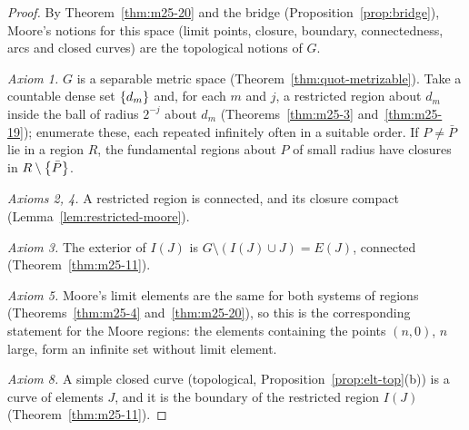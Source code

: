 \begin{proof}
By Theorem~\ref{thm:m25-20} and the bridge (Proposition~\ref{prop:bridge}), Moore's notions for this space (limit
points, closure, boundary, connectedness, arcs and closed curves) are the topological notions of $G$.

\emph{Axiom 1.} $G$ is a separable metric space (Theorem~\ref{thm:quot-metrizable}). Take a countable dense set
$\left\{ d_m \right\}$ and, for each $m$ and $j$, a restricted region about $d_m$ inside the ball of radius $2^{-j}$ about
$d_m$ (Theorems~\ref{thm:m25-3} and~\ref{thm:m25-19}); enumerate these, each repeated infinitely often in a
suitable order. If $P\ne\bar P$ lie in a region $R$, the fundamental regions about $P$ of small radius have closures
in $R\setminus\left\{ \bar P \right\}$.

\emph{Axioms 2, 4.} A restricted region is connected, and its closure compact (Lemma~\ref{lem:restricted-moore}).

\emph{Axiom 3.} The exterior of $I(J)$ is $G\setminus(I(J)\cup J)=E(J)$, connected (Theorem~\ref{thm:m25-11}).

\emph{Axiom 5.} Moore's limit elements are the same for both systems of regions (Theorems~\ref{thm:m25-4}
and~\ref{thm:m25-20}), so this is the corresponding statement for the Moore regions: the elements containing the
points $(n,0)$, $n$ large, form an infinite set without limit element.

\emph{Axiom 8.} A simple closed curve (topological, Proposition~\ref{prop:elt-top}(b)) is a curve of elements $J$, and
it is the boundary of the restricted region $I(J)$ (Theorem~\ref{thm:m25-11}).


\end{proof}
